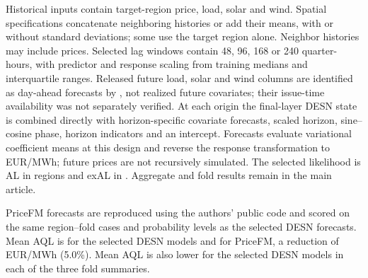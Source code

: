\documentclass[12pt,letterpaper]{article}
\numberwithin{suppalgorithm}{section}
\numberwithin{equation}{section}
\numberwithin{table}{section}
\numberwithin{figure}{section}
\begin{document}
Historical inputs contain target-region price, load, solar and wind.
Spatial specifications concatenate neighboring histories or add their
means, with or without standard deviations; some use the target region
alone. Neighbor histories may include prices. Selected lag windows contain
48, 96, 168 or 240 quarter-hours, with predictor and response scaling
from training medians and interquartile ranges.
Released future load, solar and wind columns are identified as day-ahead
forecasts by \citet{YuEtAl2026PriceFM}, not realized future covariates;
their issue-time availability was not separately verified.
At each origin the final-layer DESN state is combined directly with
horizon-specific covariate forecasts, scaled horizon, sine--cosine phase,
horizon indicators and an intercept. Forecasts evaluate variational
coefficient means at this design and reverse the response transformation
to EUR/MWh; future prices are not recursively simulated.
The selected likelihood is AL in \PricefmCurrentAlRegions{} regions and exAL in \PricefmCurrentExalRegions{}. Aggregate
and fold results remain in the main article.

PriceFM forecasts are reproduced using the authors' public code and scored
on the same region--fold cases and probability levels as the selected DESN
forecasts. Mean AQL is \PricefmFullMeanSelectedAql{} for the selected DESN
models and \PricefmFullMeanPricefmAql{} for PriceFM, a reduction of
\PricefmFullMeanReductionAql{} EUR/MWh (5.0\%). Mean AQL is also lower for
the selected DESN models in each of the three fold summaries.




\end{document}
